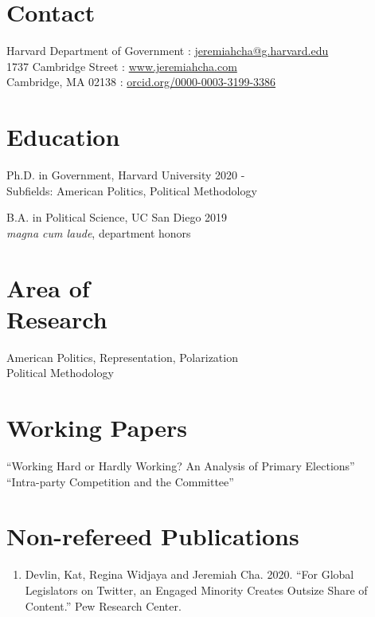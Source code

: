 \documentclass[margin, line]{res}
\begin{document}
\begin{resume}

\section{Contact} 
Harvard Department of Government \hfill \Letter: \href{mailto:jeremiahcha@g.harvard.edu}{jeremiahcha@g.harvard.edu}\\
1737 Cambridge Street \hfill \Mundus: \href{httsp://www.jeremiahcha.com}{www.jeremiahcha.com}\\
Cambridge, MA 02138 \hfill \Mundus: \href{https://orcid.org/0000-0003-3199-3386}{orcid.org/0000-0003-3199-3386}

\section{Education} 
Ph.D. in Government, Harvard University \hfill 2020 - \\
\hspace*{5mm}Subfields: American Politics, Political Methodology

B.A. in Political Science, UC San Diego \hfill 2019\\
\hspace*{5mm}\textit{magna cum laude}, department honors

\section{Area of \\Research} 
American Politics, Representation, Polarization\\
Political Methodology

\section{Working Papers} 
``Working Hard or Hardly Working? An Analysis of Primary Elections''\\
``Intra-party Competition and the Committee''

\section{Non-refereed Publications}
\begin{enumerate}

\item Devlin, Kat, Regina Widjaya and Jeremiah Cha. 2020. ``For Global Legislators on Twitter, an Engaged Minority Creates Outsize Share of Content.'' Pew Research Center. 


\end{enumerate}
\end{resume}
\end{document}
